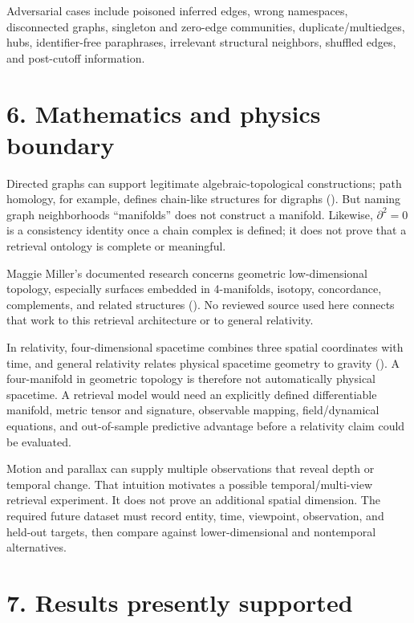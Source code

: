 \documentclass[
  english,
  11pt,
]{article}
\begin{document}
Adversarial cases include poisoned inferred edges, wrong namespaces,
disconnected graphs, singleton and zero-edge communities,
duplicate/multiedges, hubs, identifier-free paraphrases, irrelevant
structural neighbors, shuffled edges, and post-cutoff information.

\section{6. Mathematics and physics
boundary}\label{mathematics-and-physics-boundary}

Directed graphs can support legitimate algebraic-topological
constructions; path homology, for example, defines chain-like structures
for digraphs ().
But naming graph neighborhoods ``manifolds'' does not construct a
manifold. Likewise, \(\partial^2=0\) is a consistency identity once a
chain complex is defined; it does not prove that a retrieval ontology is
complete or meaningful.

Maggie Miller's documented research concerns geometric low-dimensional
topology, especially surfaces embedded in 4-manifolds, isotopy,
concordance, complements, and related structures
(). No reviewed source used
here connects that work to this retrieval architecture or to general
relativity.

In relativity, four-dimensional spacetime combines three spatial
coordinates with time, and general relativity relates physical spacetime
geometry to gravity (). A four-manifold in geometric topology
is therefore not automatically physical spacetime. A retrieval model
would need an explicitly defined differentiable manifold, metric tensor
and signature, observable mapping, field/dynamical equations, and
out-of-sample predictive advantage before a relativity claim could be
evaluated.

Motion and parallax can supply multiple observations that reveal depth
or temporal change. That intuition motivates a possible
temporal/multi-view retrieval experiment. It does not prove an
additional spatial dimension. The required future dataset must record
entity, time, viewpoint, observation, and held-out targets, then compare
against lower-dimensional and nontemporal alternatives.

\section{7. Results presently
supported}\label{results-presently-supported}
\end{document}
